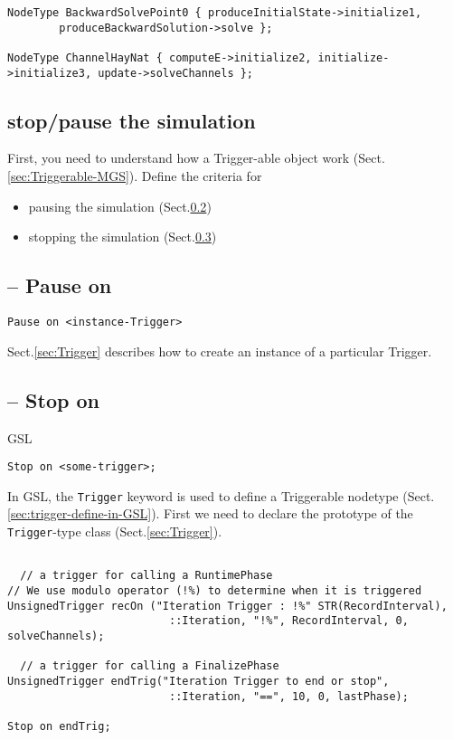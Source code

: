 \begin{itemize}
\begin{verbatim}
NodeType BackwardSolvePoint0 { produceInitialState->initialize1,
        produceBackwardSolution->solve };

NodeType ChannelHayNat { computeE->initialize2, initialize->initialize3, update->solveChannels };
\end{verbatim}

\subsection{stop/pause the simulation}

First, you need to understand how a Trigger-able object work
(Sect.\ref{sec:Triggerable-MGS}). Define the criteria for 
  \begin{itemize}
    \item pausing the simulation (Sect.\ref{sec:GSL-when-to-pause})
    \item stopping the simulation (Sect.\ref{sec:GSL-when-to-stop})
  \end{itemize}
  \end{itemize}
  
\subsection{-- Pause on}
\label{sec:GSL-when-to-pause}

\begin{verbatim}
Pause on <instance-Trigger>
\end{verbatim}

Sect.\ref{sec:Trigger} describes how to create an instance of a particular
Trigger.

\subsection{-- Stop on}
\label{sec:GSL-when-to-stop}
\label{sec:GSL-Stop}

GSL
\begin{verbatim}
Stop on <some-trigger>;
\end{verbatim}

In GSL, the \verb!Trigger! keyword is used to define a Triggerable nodetype
(Sect.\ref{sec:trigger-define-in-GSL}). First we need to declare the prototype
of the \verb!Trigger!-type class (Sect.\ref{sec:Trigger}). 

\begin{verbatim}

  // a trigger for calling a RuntimePhase
// We use modulo operator (!%) to determine when it is triggered 
UnsignedTrigger recOn ("Iteration Trigger : !%" STR(RecordInterval),
                         ::Iteration, "!%", RecordInterval, 0, solveChannels);

  // a trigger for calling a FinalizePhase
UnsignedTrigger endTrig("Iteration Trigger to end or stop",
                         ::Iteration, "==", 10, 0, lastPhase);

Stop on endTrig;
\end{verbatim}

